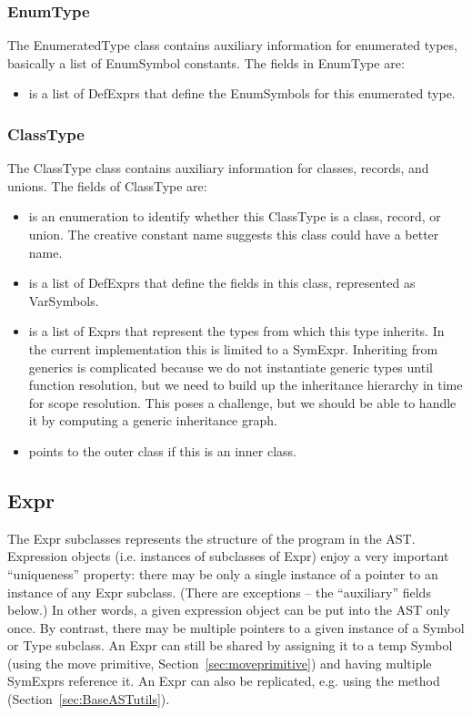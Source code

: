 \documentclass[10pt]{article}
\begin{document}
\subsubsection{EnumType}
\label{sec:enumtype}

The EnumeratedType class contains auxiliary information for enumerated
types, basically a list of EnumSymbol constants.  The fields in
EnumType are:
\begin{itemize}
\item {} is a list of DefExprs that define the
  EnumSymbols for this enumerated type.
\end{itemize}

\subsubsection{ClassType}
\label{sec:classtype}

The ClassType class contains auxiliary information for classes,
records, and unions.  The fields of ClassType are:
\begin{itemize}
\item {} is an enumeration to identify whether
  this ClassType is a class, record, or union.  The creative constant
  name  suggests this class could have a better name.
\item {} is a list of DefExprs that define the fields
  in this class, represented as VarSymbols.
\item {} is a list of Exprs that represent the types
  from which this type inherits.  In the current implementation this
  is limited to a SymExpr.  Inheriting from generics is complicated
  because we do not instantiate generic types until function
  resolution, but we need to build up the inheritance hierarchy in
  time for scope resolution.  This poses a challenge, but we should be
  able to handle it by computing a generic inheritance graph.
\item {} points to the outer class if this is an inner
  class.
\end{itemize}

\subsection{Expr}

The Expr subclasses represents the structure of the program in the
AST.  Expression objects (i.e. instances of subclasses of Expr) enjoy
a very important ``uniqueness'' property: there may be only a single
instance of a pointer to an instance of any Expr subclass.  (There are
exceptions -- the ``auxiliary'' fields below.)  In other words, a
given expression object can be put into the AST only once.  By
contrast, there may be multiple pointers to a given instance of a
Symbol or Type subclass.  An Expr can still be shared by assigning it
to a temp Symbol (using the move primitive,
Section~\ref{sec:moveprimitive}) and having multiple SymExprs
reference it.  An Expr can also be replicated, e.g. using the
 method (Section~\ref{sec:BaseASTutils}).
\end{document}
